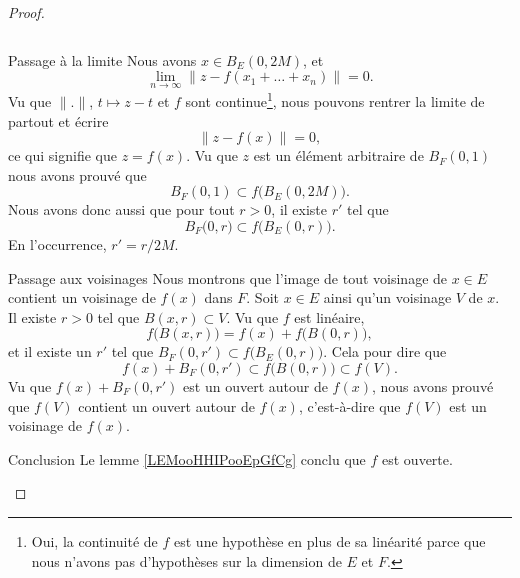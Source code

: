 \begin{proof}
\begin{subproof}
\begin{equation}
        \end{equation}
    \item[Passage à la limite]
        Nous avons \( x\in B_E(0,2M)\), et
        \begin{equation}
            \lim_{n\to \infty} \| z-f(x_1+\ldots +x_n) \|=0.
        \end{equation}
        Vu que \( \| . \|\), \( t\mapsto z-t\) et \( f\) sont continue\footnote{Oui, la continuité de \( f\) est une hypothèse en plus de sa linéarité parce que nous n'avons pas d'hypothèses sur la dimension de \( E\) et \( F\).}, nous pouvons rentrer la limite de partout et écrire
        \begin{equation}
            \| z-f(x) \|=0,
        \end{equation}
        ce qui signifie que \( z=f(x)\). Vu que \( z\) est un élément arbitraire de \( B_F(0,1)\) nous avons prouvé que
        \begin{equation}
            B_F(0,1)\subset f\big( B_E(0,2M) \big).
        \end{equation}
        Nous avons donc aussi que pour tout \( r>0\), il existe \( r'\) tel que
        \begin{equation}
            B_F\big( 0, r \big)\subset f\big( B_E(0,r) \big).
        \end{equation}
        En l'occurrence, \( r'=r/2M\).
    \item[Passage aux voisinages]
        Nous montrons que l'image de tout voisinage de \( x\in E\) contient un voisinage de \( f(x)\) dans \( F\). Soit \( x\in E\) ainsi qu'un voisinage \( V\) de \( x\). Il existe \( r>0\) tel que \( B(x,r)\subset V\). Vu que \( f\) est linéaire,
        \begin{equation}
            f\big( B(x,r) \big)=f(x)+f\big( B(0,r) \big),
        \end{equation}
        et il existe un \( r'\) tel que \( B_F(0,r')\subset f\big( B_E(0,r) \big)\). Cela pour dire que
        \begin{equation}
            f(x)+B_F(0,r')\subset f\big( B(0,r) \big)\subset f(V).
        \end{equation}
        Vu que \( f(x)+B_F(0,r')\) est un ouvert autour de \( f(x)\), nous avons prouvé que \( f(V)\) contient un ouvert autour de \( f(x)\), c'est-à-dire que \( f(V)\) est un voisinage de \( f(x)\).
    \item[Conclusion]
        Le lemme \ref{LEMooHHIPooEpGfCg} conclu que \( f\) est ouverte.
    \end{subproof}
    
\end{proof}

